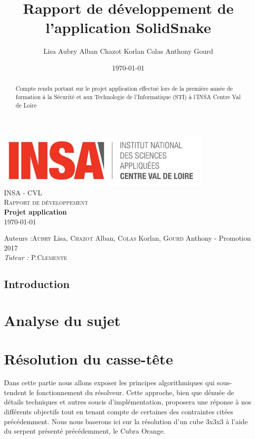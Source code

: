 \documentclass[a4paper,10pt]{report}
\title{Rapport de développement de l'application SolidSnake}
\author{Lisa Aubry Alban Chazot Korlan Colas Anthony Gourd}
\date{\today}
\begin{document}
\begin{titlepage}
  \begin{center}

    \includegraphics[scale=1]{img/insacvl.jpg}~\\[1.5cm]

    \textsc{\LARGE INSA - CVL}\\[2cm]

    \textsc{\Large Rapport de développement}\\[1.5cm]

    { \huge \bfseries Projet application\\[0.4cm] }
    \today
    
    \vfill

    Auteurs :\textsc{Aubry} Lisa, \textsc{Chazot} Alban, \textsc{Colas} Korlan, \textsc{Gourd} Anthony - Promotion 2017\\
    \emph{Tuteur :} P.\textsc{Clemente}\\
  \end{center}
\end{titlepage}

\begin{abstract}
Compte rendu portant sur le projet application effectué lors de la première année de formation à la Sécurité et aux Technologie de l'Informatique (STI) à l'INSA Centre Val de Loire
\end{abstract}

\tableofcontents

\chapter*{Introduction}


\part{Analyse du sujet}



\part{Résolution du casse-tête}
Dans cette partie nous allons exposer les principes algorithmiques qui sous-tendent le fonctionnement du résolveur. Cette approche, bien que dénuée de détails techniques et autres soucis d’implémentation, proposera une réponse à nos différents objectifs tout en tenant compte de certaines des contraintes citées précédemment.  Nous nous baserons ici sur la résolution d’un cube 3x3x3 à l’aide du serpent présenté précédemment, le Cubra Orange. 
\end{document}
